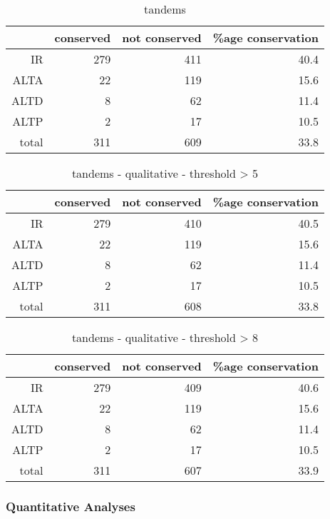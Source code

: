 \documentclass{article}
\begin{document}
\begin{table}[ht]
\centering
\begin{tabular}{rrrr}
  \hline
 & conserved & not conserved & \%age conservation \\ 
  \hline
IR & 279 & 411 & 40.4 \\ 
  ALTA & 22 & 119 & 15.6 \\ 
  ALTD & 8 & 62 & 11.4 \\ 
  ALTP & 2 & 17 & 10.5 \\ 
  total & 311 & 609 & 33.8 \\ 
   \hline
\end{tabular}
\caption{tandems} 
\end{table}%
\begin{table}[ht]
\centering
\begin{tabular}{rrrr}
  \hline
 & conserved & not conserved & \%age conservation \\ 
  \hline
IR & 279 & 410 & 40.5 \\ 
  ALTA & 22 & 119 & 15.6 \\ 
  ALTD & 8 & 62 & 11.4 \\ 
  ALTP & 2 & 17 & 10.5 \\ 
  total & 311 & 608 & 33.8 \\ 
   \hline
\end{tabular}
\caption{tandems - qualitative - threshold > 5} 
\end{table}%
\begin{table}[ht]
\centering
\begin{tabular}{rrrr}
  \hline
 & conserved & not conserved & \%age conservation \\ 
  \hline
IR & 279 & 409 & 40.6 \\ 
  ALTA & 22 & 119 & 15.6 \\ 
  ALTD & 8 & 62 & 11.4 \\ 
  ALTP & 2 & 17 & 10.5 \\ 
  total & 311 & 607 & 33.9 \\ 
   \hline
\end{tabular}
\caption{tandems - qualitative - threshold > 8} 
\end{table}
\subsubsection*{Quantitative Analyses}
\end{document}

